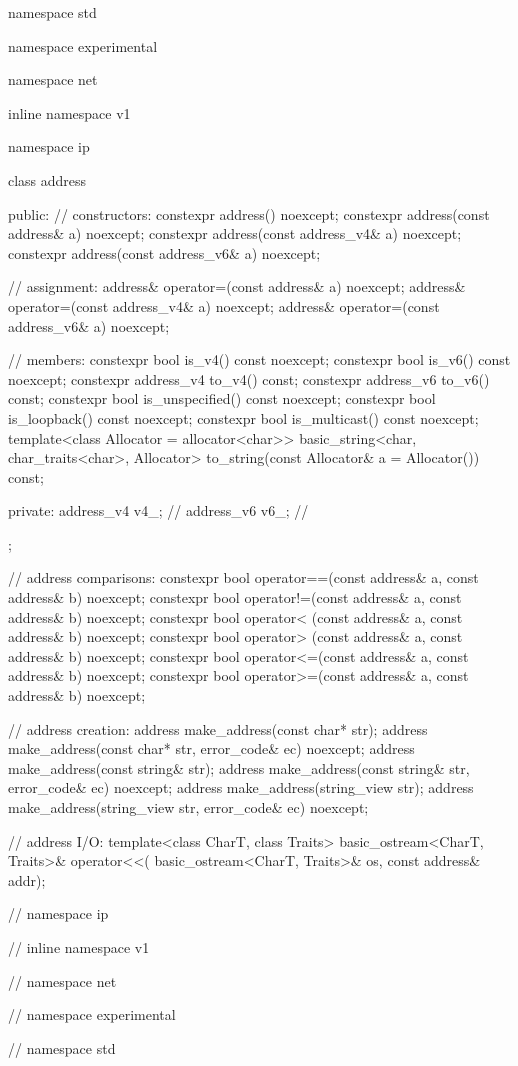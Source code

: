 \begin{codeblock}
namespace std {
namespace experimental {
namespace net {
inline namespace v1 {
namespace ip {

  class address
  {
  public:
    // constructors:
    constexpr address() noexcept;
    constexpr address(const address& a) noexcept;
    constexpr address(const address_v4& a) noexcept;
    constexpr address(const address_v6& a) noexcept;

    // assignment:
    address& operator=(const address& a) noexcept;
    address& operator=(const address_v4& a) noexcept;
    address& operator=(const address_v6& a) noexcept;

    // members:
    constexpr bool is_v4() const noexcept;
    constexpr bool is_v6() const noexcept;
    constexpr address_v4 to_v4() const;
    constexpr address_v6 to_v6() const;
    constexpr bool is_unspecified() const noexcept;
    constexpr bool is_loopback() const noexcept;
    constexpr bool is_multicast() const noexcept;
    template<class Allocator = allocator<char>>
      basic_string<char, char_traits<char>, Allocator>
        to_string(const Allocator& a = Allocator()) const;

  private:
    address_v4 v4_; // \expos
    address_v6 v6_; // \expos
  };

  // address comparisons:
  constexpr bool operator==(const address& a, const address& b) noexcept;
  constexpr bool operator!=(const address& a, const address& b) noexcept;
  constexpr bool operator< (const address& a, const address& b) noexcept;
  constexpr bool operator> (const address& a, const address& b) noexcept;
  constexpr bool operator<=(const address& a, const address& b) noexcept;
  constexpr bool operator>=(const address& a, const address& b) noexcept;

  // address creation:
  address make_address(const char* str);
  address make_address(const char* str, error_code& ec) noexcept;
  address make_address(const string& str);
  address make_address(const string& str, error_code& ec) noexcept;
  address make_address(string_view str);
  address make_address(string_view str, error_code& ec) noexcept;

  // address I/O:
  template<class CharT, class Traits>
    basic_ostream<CharT, Traits>& operator<<(
      basic_ostream<CharT, Traits>& os, const address& addr);

} // namespace ip
} // inline namespace v1
} // namespace net
} // namespace experimental
} // namespace std
\end{codeblock}

